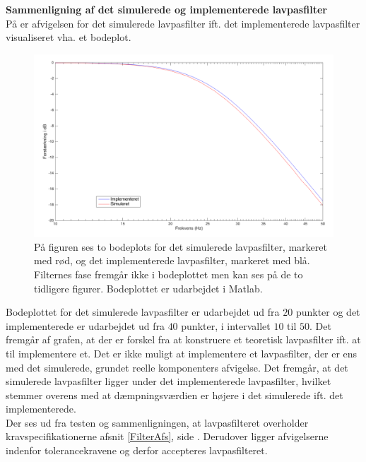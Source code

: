 \textbf{Sammenligning af det simulerede og implementerede lavpasfilter} \\
På  er afvigelsen for det simulerede lavpasfilter ift. det implementerede lavpasfilter visualiseret vha. et bodeplot. 
\begin{figure}[H]
	\centering
	\includegraphics[scale=0.4]{figures/cProblemloesning/sammenligning_sim_imp.PNG}
	\caption{På figuren ses to bodeplots for det simulerede lavpasfilter, markeret med rød, og det implementerede lavpasfilter, markeret med blå. Filternes fase fremgår ikke i bodeplottet men kan ses på de to tidligere figurer. Bodeplottet er udarbejdet i Matlab.}
	\label{fig:sammenligning_sim_imp}
\end{figure} 
Bodeplottet for det simulerede lavpasfilter er udarbejdet ud fra $20$ punkter og det implementerede er udarbejdet ud fra $40$ punkter, i intervallet $10$ til $50$. Det fremgår af grafen, at der er forskel fra at konstruere et teoretisk lavpasfilter ift. at til implementere et. Det er ikke muligt at implementere et lavpasfilter, der er ens med det simulerede, grundet reelle komponenters afvigelse. Det fremgår, at det simulerede lavpasfilter ligger under det implementerede lavpasfilter, hvilket stemmer overens med at dæmpningsværdien er højere i det simulerede ift. det implementerede. \\
Der ses ud fra testen og sammenligningen, at lavpasfilteret overholder kravspecifikationerne afsnit \ref{FilterAfs}, side \pageref{FilterAfs}. Derudover ligger afvigelserne indenfor tolerancekravene og derfor accepteres lavpasfilteret. 